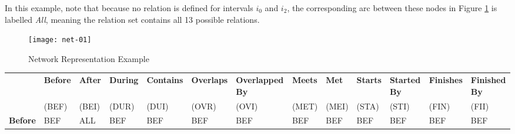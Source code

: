 \documentclass[11pt]{report}
\newenvironment{vvarmargin}[2]
{
  \begin{list}{}
  {
    \setlength{\topsep}{0pt}
    \setlength{\leftmargin}{0pt}
    \setlength{\rightmargin}{0pt}
    \setlength{\listparindent}{\parindent}
    \setlength{\itemindent}{\parindent}
    \setlength{\parsep}{0pt plus 1pt}
    \addtolength{\leftmargin}{#1}\addtolength{\rightmargin}{#2}
  }
  \item
}
{
  \end{list}
}
\begin{document}
          In this example, note that because no relation is defined for intervals
          ${i_0}$ and ${i_2}$, the corresponding arc between these nodes in Figure
          \ref{fig-net-ex-01} is labelled {\em All}, meaning the relation set contains
          all 13 possible relations.

          \begin{figure}[tbhp]
            \begin{center}
              \texttt{[image: net-01]}
              \caption{Network Representation Example}
              \label{fig-net-ex-01}
            \end{center}
          \end{figure}

        \begin{table}[p]
          \begin{vvarmargin}{-4cm}{-4cm}
            \begin{center}
              \tiny
              \begin{tabular}[t]{|r|l|l|l|l|l|l|l|l|l|l|l|l|}
                \hline
                                        & \textbf{Before}         & \textbf{After}          & \textbf{During}         & \textbf{Contains}       & \textbf{Overlaps}       & \textbf{Overlapped By}  & \textbf{Meets}          & \textbf{Met}            & \textbf{Starts}         & \textbf{Started By}     & \textbf{Finishes}       & \textbf{Finished By}    \\
                                        & (BEF)                   & (BEI)                   & (DUR)                   & (DUI)                   & (OVR)                   & (OVI)                   & (MET)                   & (MEI)                   & (STA)                   & (STI)                   & (FIN)                   & (FII)                   \\
                \hline                                                                                                                                                                                                                                                                                                                                          
                \textbf{Before}         & BEF                     & ALL                     & BEF                     & BEF                     & BEF                     & BEF                     & BEF                     & BEF                     & BEF                     & BEF                     & BEF                     & BEF                     \\

\end{tabular}
\end{center}
\end{vvarmargin}
\end{table}
\end{document}
